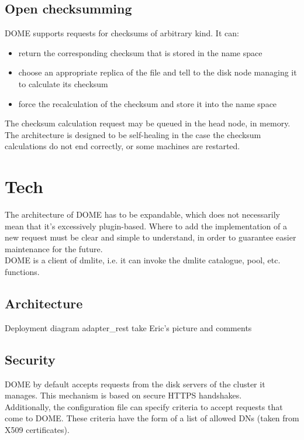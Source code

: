 \documentclass[a4paper,10pt]{scrreprt}
\begin{document}
\subsection{Open checksumming}
DOME supports requests for checksums of arbitrary kind. It can:\\

\begin{itemize}
 \item return the corresponding checksum that is stored in the name space
 \item choose an appropriate replica of the file and tell to the disk node managing it to calculate its checksum
 \item force the recalculation of the checksum and store it into the name space
\end{itemize}

The checksum calculation request may be queued in the head node, in memory. The architecture is designed to be self-healing in the case the checksum
calculations do not end correctly, or some machines are restarted.





\section{Tech}

The architecture of DOME has to be expandable, which does not necessarily mean that it's excessively plugin-based. Where to add the implementation of a new request must be clear and simple to understand, in order to guarantee easier maintenance for the future.\\
DOME is a client of dmlite, i.e. it can invoke the dmlite catalogue, pool, etc. functions.\\

\subsection{Architecture}
Deployment diagram
adapter\_rest
take Eric's picture and comments

\subsection{Security}
DOME by default accepts requests from the disk servers of the cluster it manages. This mechanism is based on secure HTTPS handshakes.\\
Additionally, the configuration file can specify criteria to accept requests that come to DOME. These criteria have the form
of a list of allowed DNs (taken from X509 certificates).\\
\end{document}

